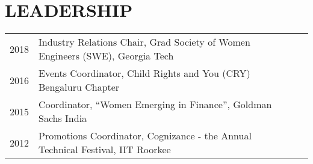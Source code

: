 \documentclass[]{deedy-resume-openfont}
\begin{document}
\begin{minipage}[t]{0.66\textwidth}

\section{LEADERSHIP} 

\begin{tabular}{rll}
2018 & Industry Relations Chair, Grad Society of Women Engineers (SWE), Georgia Tech \\                  
2016 & Events Coordinator, Child Rights and You (CRY) Bengaluru Chapter \\
2015 & Coordinator, “Women Emerging in Finance”, Goldman Sachs India \\
2012 & Promotions Coordinator, Cognizance - the Annual Technical Festival, IIT Roorkee\\
\end{tabular}
\sectionsep

\end{minipage} 
\end{document}
